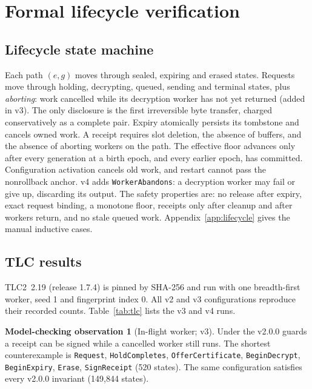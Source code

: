 \documentclass[pdflatex,sn-mathphys-num]{sn-jnl}
\theoremstyle{plain}
\theoremstyle{definition}
\newtheorem{observation}{Model-checking observation}
\newcommand{\code}[1]{\texttt{#1}}
\begin{document}
\section{Formal lifecycle verification}\label{sec:formal}

\subsection{Lifecycle state machine}
Each path $(e,g)$ moves through sealed, expiring and erased states. Requests move through holding, decrypting, queued, sending and terminal states, plus \emph{aborting}: work cancelled while its decryption worker has not yet returned (added in v3). The only disclosure is the first irreversible byte transfer, charged conservatively as a complete pair. Expiry atomically persists its tombstone and cancels owned work. A receipt requires slot deletion, the absence of buffers, and the absence of aborting workers on the path. The effective floor advances only after every generation at a birth epoch, and every earlier epoch, has committed. Configuration activation cancels old work, and restart cannot pass the nonrollback anchor. v4 adds \code{WorkerAbandons}: a decryption worker may fail or give up, discarding its output. The safety properties are: no release after expiry, exact request binding, a monotone floor, receipts only after cleanup and after workers return, and no stale queued work. Appendix~\ref{app:lifecycle} gives the manual inductive cases.

\subsection{TLC results}
TLC2~2.19 (release 1.7.4) is pinned by SHA-256 and run with one breadth-first worker, seed 1 and fingerprint index 0. All v2 and v3 configurations reproduce their recorded counts. Table~\ref{tab:tlc} lists the v3 and v4 runs.

\begin{observation}[In-flight worker; v3]\label{obs:inflight}
Under the v2.0.0 guards a receipt can be signed while a cancelled worker still runs. The shortest counterexample is \code{Request}, \code{HoldCompletes}, \code{OfferCertificate}, \code{BeginDecrypt}, \code{BeginExpiry}, \code{Erase}, \code{SignReceipt} (520 states). The same configuration satisfies every v2.0.0 invariant (149,844 states).
\end{observation}
\end{document}
